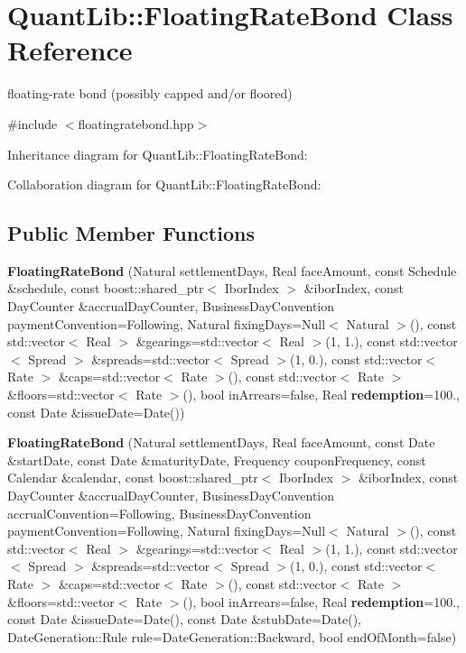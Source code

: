 \section{Quant\+Lib\+:\+:Floating\+Rate\+Bond Class Reference}
\label{class_quant_lib_1_1_floating_rate_bond}


floating-\/rate bond (possibly capped and/or floored)  




{\ttfamily \#include $<$floatingratebond.\+hpp$>$}



Inheritance diagram for Quant\+Lib\+:\+:Floating\+Rate\+Bond\+:


Collaboration diagram for Quant\+Lib\+:\+:Floating\+Rate\+Bond\+:
\subsection*{Public Member Functions}
\begin{DoxyCompactItemize}
\item 
{\bfseries Floating\+Rate\+Bond} (Natural settlement\+Days, Real face\+Amount, const Schedule \&schedule, const boost\+::shared\+\_\+ptr$<$ Ibor\+Index $>$ \&ibor\+Index, const Day\+Counter \&accrual\+Day\+Counter, Business\+Day\+Convention payment\+Convention=Following, Natural fixing\+Days=Null$<$ Natural $>$(), const std\+::vector$<$ Real $>$ \&gearings=std\+::vector$<$ Real $>$(1, 1.), const std\+::vector$<$ Spread $>$ \&spreads=std\+::vector$<$ Spread $>$(1, 0.), const std\+::vector$<$ Rate $>$ \&caps=std\+::vector$<$ Rate $>$(), const std\+::vector$<$ Rate $>$ \&floors=std\+::vector$<$ Rate $>$(), bool in\+Arrears=false, Real {\bf redemption}=100., const Date \&issue\+Date=Date())\label{class_quant_lib_1_1_floating_rate_bond_ad3755afaa42e633c72b0035aeb7cf5a7}

\item 
{\bfseries Floating\+Rate\+Bond} (Natural settlement\+Days, Real face\+Amount, const Date \&start\+Date, const Date \&maturity\+Date, Frequency coupon\+Frequency, const Calendar \&calendar, const boost\+::shared\+\_\+ptr$<$ Ibor\+Index $>$ \&ibor\+Index, const Day\+Counter \&accrual\+Day\+Counter, Business\+Day\+Convention accrual\+Convention=Following, Business\+Day\+Convention payment\+Convention=Following, Natural fixing\+Days=Null$<$ Natural $>$(), const std\+::vector$<$ Real $>$ \&gearings=std\+::vector$<$ Real $>$(1, 1.), const std\+::vector$<$ Spread $>$ \&spreads=std\+::vector$<$ Spread $>$(1, 0.), const std\+::vector$<$ Rate $>$ \&caps=std\+::vector$<$ Rate $>$(), const std\+::vector$<$ Rate $>$ \&floors=std\+::vector$<$ Rate $>$(), bool in\+Arrears=false, Real {\bf redemption}=100., const Date \&issue\+Date=Date(), const Date \&stub\+Date=Date(), Date\+Generation\+::\+Rule rule=Date\+Generation\+::\+Backward, bool end\+Of\+Month=false)\label{class_quant_lib_1_1_floating_rate_bond_a3f7f8836ba1a35ebace77ecab06d42cc}

\end{DoxyCompactItemize}
